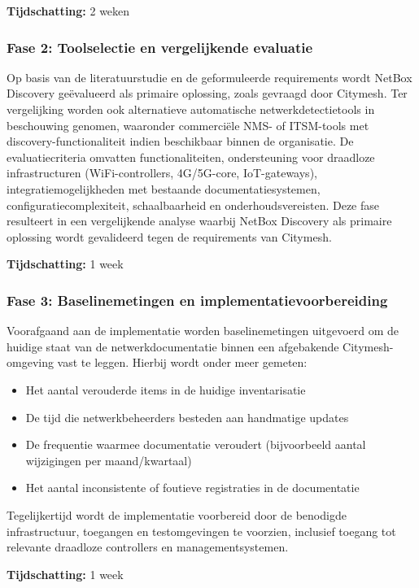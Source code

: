 \textbf{Tijdschatting:} 2 weken

\subsubsection{Fase 2: Toolselectie en vergelijkende evaluatie}

Op basis van de literatuurstudie en de geformuleerde requirements wordt NetBox Discovery geëvalueerd als primaire oplossing, zoals gevraagd door Citymesh. Ter vergelijking worden ook alternatieve automatische netwerkdetectietools in beschouwing genomen, waaronder commerciële NMS- of ITSM-tools met discovery-functionaliteit indien beschikbaar binnen de organisatie.\autocite{NetBoxDiscoveryDocs,ServiceNowDiscovery} De evaluatiecriteria omvatten functionaliteiten, ondersteuning voor draadloze infrastructuren (WiFi-controllers, 4G/5G-core, IoT-gateways), integratiemogelijkheden met bestaande documentatiesystemen, configuratiecomplexiteit, schaalbaarheid en onderhoudsvereisten. Deze fase resulteert in een vergelijkende analyse waarbij NetBox Discovery als primaire oplossing wordt gevalideerd tegen de requirements van Citymesh.

\textbf{Tijdschatting:} 1 week

\subsubsection{Fase 3: Baselinemetingen en implementatievoorbereiding}

Voorafgaand aan de implementatie worden baselinemetingen uitgevoerd om de huidige staat van de netwerkdocumentatie binnen een afgebakende Citymesh-omgeving vast te leggen. Hierbij wordt onder meer gemeten:
\begin{itemize}
  \item Het aantal verouderde items in de huidige inventarisatie
  \item De tijd die netwerkbeheerders besteden aan handmatige updates
  \item De frequentie waarmee documentatie veroudert (bijvoorbeeld aantal wijzigingen per maand/kwartaal)
  \item Het aantal inconsistente of foutieve registraties in de documentatie
\end{itemize}
Tegelijkertijd wordt de implementatie voorbereid door de benodigde infrastructuur, toegangen en testomgevingen te voorzien, inclusief toegang tot relevante draadloze controllers en managementsystemen.

\textbf{Tijdschatting:} 1 week

